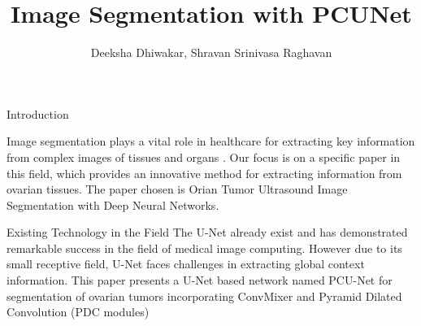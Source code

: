 \documentclass{beamer}
\title{Image Segmentation with PCUNet}
\author{Deeksha Dhiwakar, Shravan Srinivasa Raghavan}
\begin{document}
\maketitle
\begin{frame}{Introduction}
    
Image segmentation plays a vital role in healthcare for extracting key information from complex images of tissues and organs .
Our focus is on a specific paper in this field, which provides an innovative method for extracting information from
ovarian tissues. The paper chosen is Orian Tumor Ultrasound Image Segmentation
with Deep Neural Networks.
\end{frame}
\begin{frame}{Existing Technology in the Field}
    The U-Net already exist and has demonstrated remarkable success in the field of medical image computing. However due to its
    small receptive field, U-Net faces challenges in extracting global context information. This paper presents a U-Net based
    network named PCU-Net for segmentation of ovarian tumors incorporating ConvMixer and Pyramid Dilated Convolution (PDC modules)

\end{frame}
\end{document}
